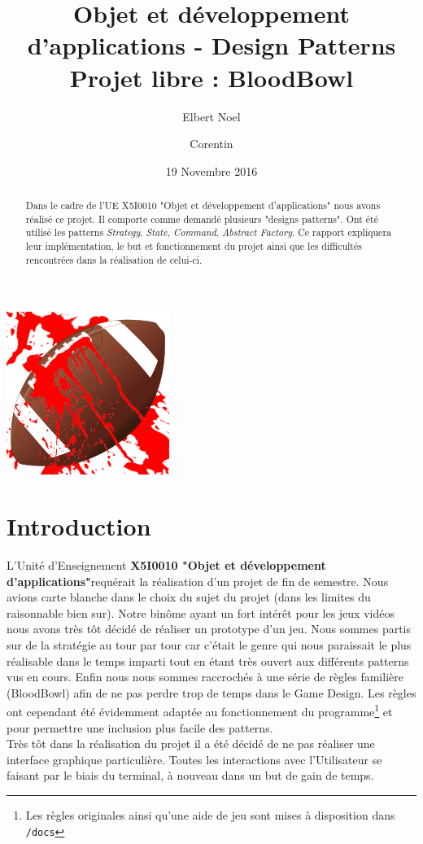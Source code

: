 \documentclass{article}
\title{Objet et développement d'applications - Design Patterns\\
Projet libre : BloodBowl}
\author{Elbert Noel \bsc{NYUNTING} \and Corentin \bsc{CHÉDOTAL}}
\date{19 Novembre 2016}
\newcommand{\info}{\texttt}
\newcommand{\pattern}{\emph}
\newcommand{\ue}{\textbf{X5I0010 "Objet et développement d'applications"}}
\begin{document}
\maketitle

\centerline{\includegraphics[scale=0.75]{img/logo.png}}

\begin{abstract}
    Dans le cadre de l'UE X5I0010 "Objet et développement d'applications" nous avons réalisé ce projet. Il comporte comme demandé plusieurs "designs patterns". Ont été utilisé les patterns \pattern{Strategy}, \pattern{State}, \pattern{Command}, \pattern{Abstract Factory}. Ce rapport expliquera leur implémentation, le but et fonctionnement du projet ainsi que les difficultés rencontrées dans la réalisation de celui-ci.
\end{abstract}

\tableofcontents

\section{Introduction}
    
    L'Unité d'Enseignement \ue requérait la réalisation d'un projet de fin de semestre. Nous avions carte blanche dans le choix du sujet du projet (dans les limites du raisonnable bien sur). Notre binôme ayant un fort intérêt pour les jeux vidéos nous avons très tôt décidé de réaliser un prototype d'un jeu. Nous sommes partis sur de la stratégie au tour par tour car c'était le genre qui nous paraissait le plus réalisable dans le temps imparti tout en étant très ouvert aux différents patterns vus en cours. Enfin nous nous sommes raccrochés à une série de règles familière (BloodBowl) afin de ne pas perdre trop de temps dans le Game Design. Les règles ont cependant été évidemment adaptée au fonctionnement du programme\footnote{Les règles originales ainsi qu'une aide de jeu sont mises à disposition dans \info{/docs}} et pour permettre une inclusion plus facile des patterns.\\
    Très tôt dans la réalisation du projet il a été décidé de ne pas réaliser une interface graphique particulière. Toutes les interactions avec l'Utilisateur se faisant par le biais du terminal, à nouveau dans un but de gain de temps.
\end{document}
